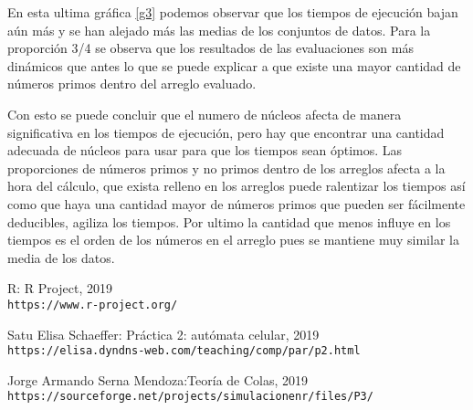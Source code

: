 \documentclass{article}
\begin{document}
En esta ultima gráfica \ref{g3} podemos observar que los tiempos de ejecución bajan aún más y se han alejado más las medias de los conjuntos de datos.
Para la proporción 3/4 se observa que los resultados de las evaluaciones son más dinámicos que antes lo que se puede explicar a que existe una mayor cantidad de números primos dentro del arreglo evaluado.

Con esto se puede concluir que el numero de núcleos afecta de manera significativa en los tiempos de ejecución, pero hay que encontrar una cantidad adecuada de núcleos para usar  para que los tiempos sean óptimos.
Las proporciones de números primos y no primos dentro de los arreglos afecta a la hora del cálculo, que exista relleno en los arreglos puede ralentizar los tiempos así como que haya una cantidad mayor de números primos que pueden ser fácilmente deducibles, agiliza los tiempos.
Por ultimo la cantidad que menos influye en los tiempos es el orden de los números en el arreglo pues se mantiene muy similar la media de los datos.

\medskip

\begin{thebibliography}{9}

R:  R Project, 2019
\\\texttt{https://www.r-project.org/}

Satu Elisa Schaeffer: Práctica 2: autómata celular, 2019
\\\texttt{https://elisa.dyndns-web.com/teaching/comp/par/p2.html}

Jorge Armando Serna Mendoza:Teoría de Colas, 2019
\\\texttt{https://sourceforge.net/projects/simulacionenr/files/P3/}


\end{thebibliography}
\end{document}

